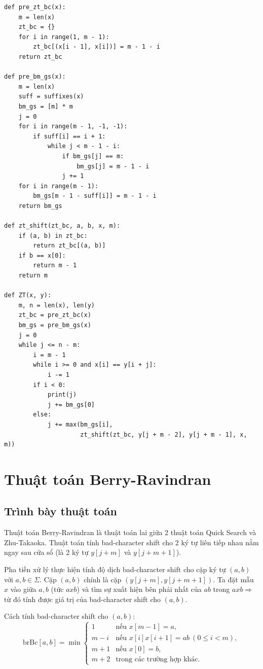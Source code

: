 \documentclass[12pt,twoside,openright]{extreport}
\begin{document}
\begin{lstlisting}[style=PythonStyle]
def pre_zt_bc(x):
    m = len(x)
    zt_bc = {}
    for i in range(1, m - 1):
        zt_bc[(x[i - 1], x[i])] = m - 1 - i
    return zt_bc

def pre_bm_gs(x):
    m = len(x)
    suff = suffixes(x)
    bm_gs = [m] * m
    j = 0
    for i in range(m - 1, -1, -1):
        if suff[i] == i + 1:
            while j < m - 1 - i:
                if bm_gs[j] == m:
                    bm_gs[j] = m - 1 - i
                j += 1
    for i in range(m - 1):
        bm_gs[m - 1 - suff[i]] = m - 1 - i
    return bm_gs

def zt_shift(zt_bc, a, b, x, m):
    if (a, b) in zt_bc:
        return zt_bc[(a, b)]
    if b == x[0]:
        return m - 1
    return m

def ZT(x, y):
    m, n = len(x), len(y)
    zt_bc = pre_zt_bc(x)
    bm_gs = pre_bm_gs(x)
    j = 0
    while j <= n - m:
        i = m - 1
        while i >= 0 and x[i] == y[i + j]:
            i -= 1
        if i < 0:
            print(j)
            j += bm_gs[0]
        else:
            j += max(bm_gs[i],
                     zt_shift(zt_bc, y[j + m - 2], y[j + m - 1], x, m))
\end{lstlisting}

\section{Thuật toán Berry-Ravindran}

\subsection{Trình bày thuật toán}

Thuật toán Berry-Ravindran là thuật toán lai giữa 2 thuật toán Quick Search và Zhu-Takaoka. Thuật toán tính bad-character shift cho 2 ký tự liên tiếp nhau nằm ngay sau cửa sổ (là 2 ký tự $y[j+m]$ và $y[j+m+1]$).

Pha tiền xử lý thực hiện tính độ dịch bad-character shift cho cặp ký tự $(a, b)$ với $a, b \in \Sigma$. Cặp $(a, b)$ chính là cặp $(y[j+m], y[j+m+1])$. Ta đặt mẫu $x$ vào giữa $a, b$ (tức $axb$) và tìm sự xuất hiện bên phải nhất của $ab$ trong $axb \Rightarrow$ từ đó tính được giá trị của bad-character shift cho $(a, b)$.

Cách tính bad-character shift cho $(a, b)$:
\[
\text{brBc}[a, b] = \min \begin{cases}
1           & \text{nếu } x[m-1] = a, \\
m - i       & \text{nếu } x[i]x[i+1] = ab \ (0 \leq i < m), \\
m + 1       & \text{nếu } x[0] = b, \\
m + 2       & \text{trong các trường hợp khác.}
\end{cases}
\]
\end{document}
